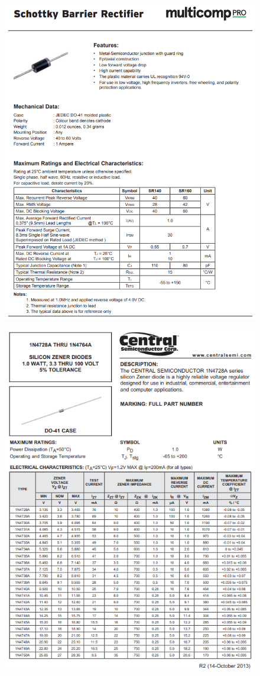 \begin{figure}[h]
    \centering
    \includegraphics[width=0.9\linewidth]{Appendices/SR160.png}
    \label{SR160}
\end{figure}
\FloatBarrier
\begin{figure}[h]
    \centering
    \includegraphics[width=0.9\linewidth]{Appendices/1N4728A.png}
    \label{1N4728A}
\end{figure}
\FloatBarrier